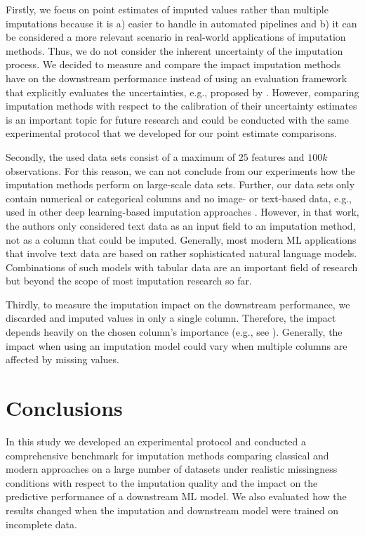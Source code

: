 \documentclass[utf8]{frontiersSCNS} %
\begin{document}
Firstly, we focus on point estimates of imputed values rather than multiple imputations because it is a) easier to handle in automated pipelines and b) it can be considered a more relevant scenario in real-world applications of imputation methods. Thus, we do not consider the inherent uncertainty of the imputation process. We decided to measure and compare the impact imputation methods have on the downstream performance instead of using an evaluation framework that explicitly evaluates the uncertainties, e.g., proposed by \cite{limitations}. However, comparing imputation methods with respect to the calibration of their uncertainty estimates is an important topic for future research and could be conducted with the same experimental protocol that we developed for our point estimate comparisons.

Secondly, the used data sets consist of a maximum of $25$ features and $100k$ observations. For this reason, we can not conclude from our experiments how the imputation methods perform on large-scale data sets. Further, our data sets only contain numerical or categorical columns and no image- or text-based data, e.g., used in other deep learning-based imputation approaches \citep{Biessmann2018a}. However, in that work, the authors only considered text data as an input field to an imputation method, not as a column that could be imputed. Generally, most modern ML applications that involve text data are based on rather sophisticated natural language models. Combinations of such models with tabular data are an important field of research \citep{Yin2020} but beyond the scope of most imputation research so far.

Thirdly, to measure the imputation impact on the downstream performance, we discarded and imputed values in only a single column. Therefore, the impact depends heavily on the chosen column's importance (e.g., see \cite{Jenga}). Generally, the impact when using an imputation model could vary when multiple columns are affected by missing values.



\section{Conclusions}
\label{sec:conclusion}
%
In this study we developed an experimental protocol and conducted a comprehensive benchmark for imputation methods comparing classical and modern approaches on a large number of datasets under realistic missingness conditions with respect to the imputation quality and the impact on the predictive performance of a downstream ML model. We also evaluated how the results changed when the imputation and downstream model were trained on incomplete data.
\end{document}
